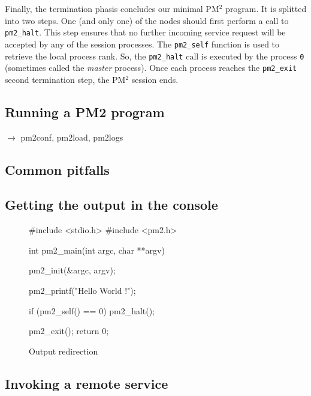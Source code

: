 \documentclass[a4paper,11pt]{article}
\def\pm2{PM$^2$\xspace}
\begin{document}
Finally, the termination phasis concludes our minimal \pm2 program. It
is splitted into two steps. One (and only one) of the nodes should
first perform a call to \texttt{pm2\_halt}. This step ensures that no
further incoming service request will be accepted by any of the
session processes. The \texttt{pm2\_self} function is used to retrieve
the local process rank. So, the \texttt{pm2\_halt} call is executed by
the process \texttt{0} (sometimes called the \emph{master} process).
Once each process reaches the \texttt{pm2\_exit} second termination
step, the \pm2 session ends.

\subsection{Running a PM2 program}
        $\rightarrow$ pm2conf, pm2load, pm2logs

\subsection{Common pitfalls}

\subsection{Getting the output in the console}
\begin{figure}
\begin{center}
\begin{boxedminipage}{0.8\textwidth}
\begin{footnotesize}
\begin{listing}{0}
 #include <stdio.h>
 #include <pm2.h>

 int pm2_main(int argc, char **argv)
 {
   pm2_init(&argc, argv);

   pm2_printf("Hello World !\n");
  
   if (pm2_self() == 0)
     pm2_halt();
  
   pm2_exit();
   return 0;
 }
\end{listing}
\end{footnotesize}
\end{boxedminipage}
\end{center}
\caption{Output redirection\label{fig:ex2}}
\end{figure}

\subsection{Invoking a remote service}
\end{document}
